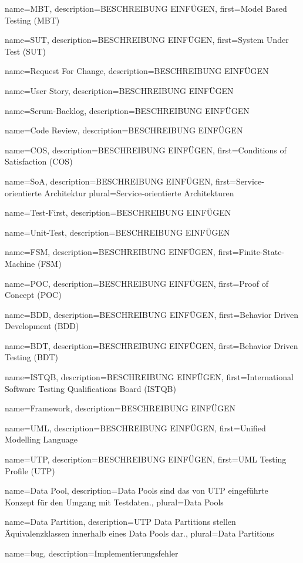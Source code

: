  {
	name={MBT},
	description={BESCHREIBUNG EINFÜGEN},
	first={Model Based Testing (MBT)}
}

 {
	name={SUT},
	description={BESCHREIBUNG EINFÜGEN},
	first={System Under Test (SUT)}
}

 {
	name={Request For Change},
	description={BESCHREIBUNG EINFÜGEN}
}

 {
	name={User Story},
	description={BESCHREIBUNG EINFÜGEN}
}

 {
	name={Scrum-Backlog},
	description={BESCHREIBUNG EINFÜGEN}
}

 {
	name={Code Review},
	description={BESCHREIBUNG EINFÜGEN}
}

 {
	name={COS},
	description={BESCHREIBUNG EINFÜGEN},
	first={Conditions of Satisfaction (COS)}
}

 {
	name={SoA},
	description={BESCHREIBUNG EINFÜGEN},
	first={Service-orientierte Architektur}
	plural={Service-orientierte Architekturen}
}

 {
	name={Test-First},
	description={BESCHREIBUNG EINFÜGEN}
}

 {
	name={Unit-Test},
	description={BESCHREIBUNG EINFÜGEN}
}

 {
	name={FSM},
	description={BESCHREIBUNG EINFÜGEN},
	first={Finite-State-Machine (FSM)}
}

 {
	name={POC},
	description={BESCHREIBUNG EINFÜGEN},
	first={Proof of Concept (POC)}
}

 {
	name={BDD},
	description={BESCHREIBUNG EINFÜGEN},
	first={Behavior Driven Development (BDD)}
}

 {
	name={BDT},
	description={BESCHREIBUNG EINFÜGEN},
	first={Behavior Driven Testing (BDT)}
}

 {
	name={ISTQB},
	description={BESCHREIBUNG EINFÜGEN},
	first={International Software Testing Qualifications Board (ISTQB)}
}

 {
	name={Framework},
	description={BESCHREIBUNG EINFÜGEN}
}

 {
	name={UML},
	description={BESCHREIBUNG EINFÜGEN},
	first={Unified Modelling Language}
}

 {
	name={UTP},
	description={BESCHREIBUNG EINFÜGEN},
	first={UML Testing Profile (UTP)}
}

 {
	name={Data Pool},
	description={Data Pools sind das von UTP eingeführte Konzept für den Umgang mit Testdaten.},
	plural={Data Pools}
}

 {
	name={Data Partition},
	description={UTP Data Partitions stellen Äquivalenzklassen innerhalb eines Data Pools dar.},
	plural={Data Partitions}
}

 {
	name={bug},
	description={Implementierungsfehler}
}